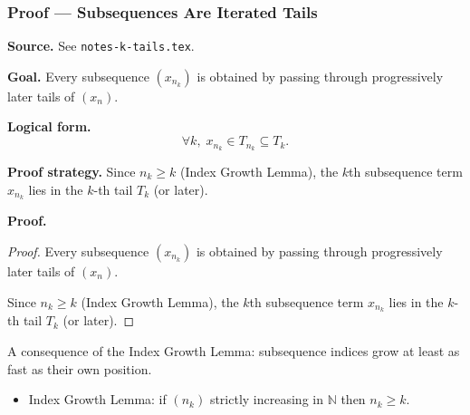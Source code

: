 
\clearpage
{}
\hypertarget{proof-RA-ABB-T-subseq-iterated-tails}{}

\subsubsection[Subsequences Are Iterated Tails]{Proof --- Subsequences Are Iterated Tails}

\bigskip

\noindent
\textbf{Source.}
See \texttt{notes-k-tails.tex}.

\vspace{0.75em}

\noindent
\textbf{Goal.}
Every subsequence $(x_{n_k})$ is obtained by passing through progressively later tails of $(x_n)$.

\vspace{0.75em}

\noindent
\textbf{Logical form.}
\[
  \forall k,\; x_{n_k} \in T_{n_k} \subseteq T_k.
\]

\vspace{0.75em}

\noindent
\textbf{Proof strategy.}
Since $n_k \ge k$ (Index Growth Lemma), the $k$th subsequence term $x_{n_k}$ lies in the $k$-th tail $T_k$ (or later).

\vspace{0.75em}

\noindent
\textbf{Proof.}
\begin{proof}
\Claim Every subsequence $(x_{n_k})$ is obtained by passing through progressively later tails of $(x_n)$.

\Given 

\Goal 

\Strategy Since $n_k \ge k$ (Index Growth Lemma), the $k$th subsequence term $x_{n_k}$ lies in the $k$-th tail $T_k$ (or later).

\medskip


\end{proof}

\begin{remark*}
A consequence of the Index Growth Lemma: subsequence indices grow at least as fast as their own position.
\end{remark*}

\begin{remark*}[Dependencies]
\begin{itemize}
  \item Index Growth Lemma: if $(n_k)$ strictly increasing in $\mathbb{N}$ then $n_k \ge k$.
\end{itemize}
\end{remark*}
